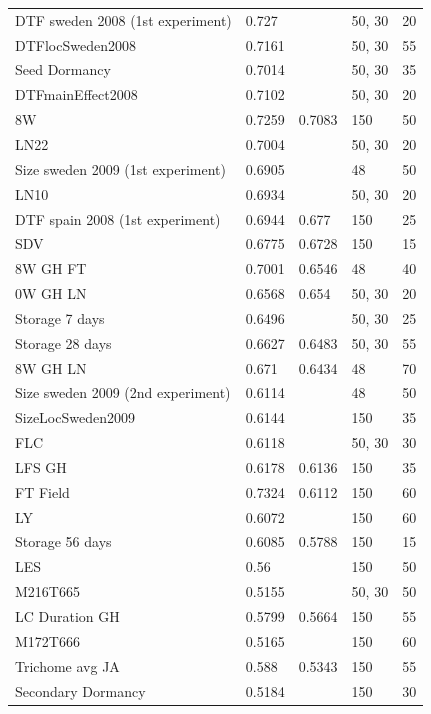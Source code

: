\begin{longtable}{p{} p{} p{} p{} p{}}
 DTF sweden 2008 (1st experiment) & 0.727 & \color{red}{0.728} & 50, 30 & 20 \\
 DTFlocSweden2008 & 0.7161 & \color{red}{0.7271} & 50, 30 & 55 \\
 Seed Dormancy & 0.7014 & \color{red}{0.7241} & 50, 30 & 35 \\
 DTFmainEffect2008 & 0.7102 & \color{red}{0.7142} & 50, 30 & 20 \\
 8W & 0.7259 & 0.7083 & 150 & 50 \\
 LN22 & 0.7004 & \color{red}{0.7069} & 50, 30 & 20 \\
 Size sweden 2009 (1st experiment) & 0.6905 & \color{red}{0.6994} & 48 & 50 \\
 LN10 & 0.6934 & \color{red}{0.698} & 50, 30 & 20 \\
 DTF spain 2008 (1st experiment) & 0.6944 & 0.677 & 150 & 25 \\
 SDV & 0.6775 & 0.6728 & 150 & 15 \\
 8W GH FT & 0.7001 & 0.6546 & 48 & 40 \\
 0W GH LN & 0.6568 & 0.654 & 50, 30 & 20 \\
 Storage 7 days & 0.6496 & \color{red}{0.65} & 50, 30 & 25 \\
 Storage 28 days & 0.6627 & 0.6483 & 50, 30 & 55 \\
 8W GH LN & 0.671 & 0.6434 & 48 & 70 \\
 Size sweden 2009 (2nd experiment) & 0.6114 & \color{red}{0.6268} & 48 & 50 \\
 SizeLocSweden2009 & 0.6144 & \color{red}{0.619} & 150 & 35 \\
 FLC & 0.6118 & \color{red}{0.6161} & 50, 30 & 30 \\
 LFS GH & 0.6178 & 0.6136 & 150 & 35 \\
 FT Field & 0.7324 & 0.6112 & 150 & 60 \\
 LY & 0.6072 & \color{red}{0.6088} & 150 & 60 \\
 Storage 56 days & 0.6085 & 0.5788 & 150 & 15 \\
 LES & 0.56 & \color{red}{0.5764} & 150 & 50 \\
 M216T665 & 0.5155 & \color{red}{0.5674} & 50, 30 & 50 \\
 LC Duration GH & 0.5799 & 0.5664 & 150 & 55 \\
 M172T666 & 0.5165 & \color{red}{0.5487} & 150 & 60 \\
 Trichome avg JA & 0.588 & 0.5343 & 150 & 55 \\
 Secondary Dormancy & 0.5184 & \color{red}{0.5264} & 150 & 30 \\

\end{longtable}
